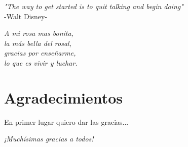 {
	\vspace*{1cm}
	\begin{flushright}
		\textit{"The way to get started is to quit talking and begin doing"}\\
		\vspace{10pt}
		-Walt Disney-
	\end{flushright}
	
	\vspace*{14cm}
	\begin{flushright}
		\textit{A mi rosa mas bonita,\\
		la más bella del rosal,\\
		gracias por enseñarme,\\
		lo que es vivir y luchar.}
	\end{flushright}
}

\chapter*{Agradecimientos}

En primer lugar quiero dar las gracias...\\

\begin{flushright}
	\emph{¡Muchísimas gracias a todos!}
\end{flushright}